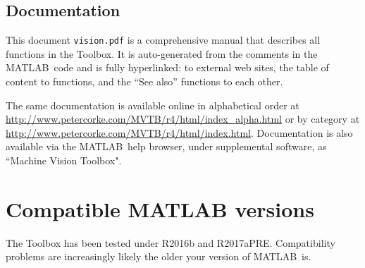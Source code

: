 \documentclass[a4paper,twoside]{report}
\def\Mlab{MATLAB}
\begin{document}
\subsection{Documentation}
This document {\tt vision.pdf} is a comprehensive manual that describes all functions in the Toolbox.
It is auto-generated from the comments in the \Mlab\ code and is fully hyperlinked:
to external web sites, the table of content to functions, and the ``See also'' functions
to each other.

The same documentation is available online in
alphabetical order at \url{http://www.petercorke.com/MVTB/r4/html/index_alpha.html}
or by category at \url{http://www.petercorke.com/MVTB/r4/html/index.html}.
Documentation is also available via the \Mlab\ help browser,  under supplemental software, as ``Machine Vision
Toolbox".


\section{Compatible MATLAB versions}
The Toolbox has been tested under R2016b and R2017aPRE.  Compatibility problems are increasingly likely the older your version of \Mlab\ is.
\end{document}

